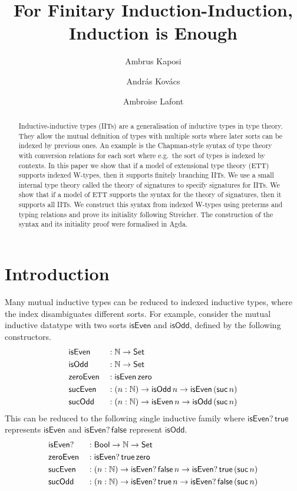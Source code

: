 \documentclass[a4paper,UKenglish,cleveref, autoref]{lipics-v2019}
\title{For Finitary Induction-Induction, \\ Induction is Enough} %
\author{Ambrus Kaposi}{E{\"o}tv{\"o}s Lor{\'a}nd University, Budapest, Hungary}{akaposi@inf.elte.hu}{https://orcid.org/0000-0001-9897-8936}{this author was supported by the National Research,
Development and Innovation Fund of Hungary, financed under the
Thematic Excellence Programme funding scheme, Project
no.\ ED18-1-2019-0030 (Application-specific highly reliable IT
solutions), by the New National Excellence Program of the Ministry
for Innovation and Technology, Project no.\ ÚNKP-19-4-ELTE-874, and
by the Bolyai Fellowship of the Hungarian Academy of Sciences,
Project no.\ BO/00659/19/3.}%
\author{Andr{\'a}s Kov{\'a}cs}{E{\"o}tv{\"o}s Lor{\'a}nd University, Budapest, Hungary}{kovacsandras@inf.elte.hu}{https://orcid.org/0000-0002-6375-9781}{this author was supported by the European Union, co-financed by the European Social Fund (EFOP-3.6.3-VEKOP-16-2017-00002).}
\author{Ambroise Lafont}{IMT Atlantique, Inria, LS2N CNRS, Nantes, France}{ambroise.lafont@gmail.com}{https://orcid.org/0000-0002-9299-641X}{this author was supported by the CoqHoTT ERC Grant 637339.}
\begin{document}
\maketitle

\begin{abstract}
  Inductive-inductive types (IITs) are a generalisation of inductive
  types in type theory. They allow the mutual definition of types with
  multiple sorts where later sorts can be indexed by previous ones. An
  example is the Chapman-style syntax of type theory with conversion
  relations for each sort where e.g.\ the sort of types is indexed by
  contexts. In this paper we show that if a model of extensional type
  theory (ETT) supports indexed W-types, then it supports finitely
  branching IITs. We use a small internal type theory called the
  theory of signatures to specify signatures for IITs. We show that if
  a model of ETT supports the syntax for the theory of signatures,
  then it supports all IITs. We construct this syntax from indexed
  W-types using preterms and typing relations and prove its initiality
  following Streicher. The construction of the syntax and its
  initiality proof were formalised in Agda.
\end{abstract}


\section{Introduction}
\label{sec:intro}

Many mutual inductive types can be reduced to indexed inductive types, where the
index disambiguates different sorts. For example, consider the mutual inductive datatype
with two sorts
$\mathsf{isEven}$ and $\mathsf{isOdd}$, defined by the following
constructors.
\begin{alignat*}{5}
  & \mathsf{isEven} && : \mathbb{N}\rightarrow\mathsf{Set} \\
  & \mathsf{isOdd} && : \mathbb{N}\rightarrow \mathsf{Set} \\
  & \mathsf{zeroEven} && : \mathsf{isEven}\,\mathsf{zero} \\
  & \mathsf{sucEven} && : (n:\mathbb{N})\rightarrow\mathsf{isOdd}\,n\rightarrow\mathsf{isEven}\,(\mathsf{suc}\,n) \\
  & \mathsf{sucOdd} && : (n:\mathbb{N})\rightarrow\mathsf{isEven}\,n\rightarrow\mathsf{isOdd}\,(\mathsf{suc}\,n)
\end{alignat*}
This can be reduced to the following single inductive family where
$\mathsf{isEven?}\,\mathsf{true}$ represents $\mathsf{isEven}$ and
$\mathsf{isEven?}\,\mathsf{false}$ represent $\mathsf{isOdd}$.
\begin{alignat*}{5}
  & \mathsf{isEven?} && : \mathsf{Bool}\rightarrow\mathbb{N}\rightarrow\mathsf{Set} \\
  & \mathsf{zeroEven} && : \mathsf{isEven?}\,\mathsf{true}\,\mathsf{zero} \\
  & \mathsf{sucEven} && : (n:\mathbb{N})\rightarrow\mathsf{isEven?}\,\mathsf{false}\,n\rightarrow\mathsf{isEven?}\,\mathsf{true}\,(\mathsf{suc}\,n) \\
  & \mathsf{sucOdd} && : (n:\mathbb{N})\rightarrow\mathsf{isEven?}\,\mathsf{true}\,n\rightarrow\mathsf{isEven?}\,\mathsf{false}\,(\mathsf{suc}\,n)
\end{alignat*}
\end{document}

